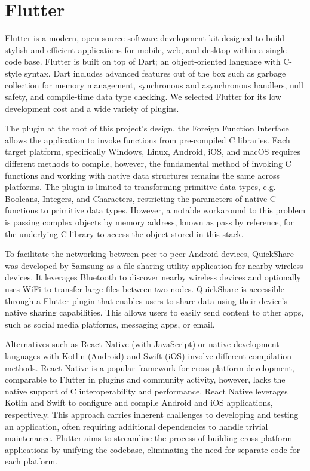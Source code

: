 \section{Flutter}
Flutter is a modern, open-source software development kit designed to build stylish and efficient applications for mobile, web, and desktop within a single code base. Flutter is built on top of Dart; an object-oriented language with C-style syntax. Dart includes advanced features out of the box such as garbage collection for memory management, synchronous and asynchronous handlers, null safety, and compile-time data type checking. We selected Flutter for its low development cost and a wide variety of plugins.

The plugin at the root of this project's design, the Foreign Function Interface allows the application to invoke functions from pre-compiled C libraries. Each target platform, specifically Windows, Linux, Android, iOS, and macOS requires different methods to compile, however, the fundamental method of invoking C functions and working with native data structures remains the same across platforms. The plugin is limited to transforming primitive data types, e.g. Booleans, Integers, and Characters, restricting the parameters of native C functions to primitive data types. However, a notable workaround to this problem is passing complex objects by memory address, known as pass by reference, for the underlying C library to access the object stored in this stack. 

To facilitate the networking between peer-to-peer Android devices, QuickShare \cite{samsung_quick_2020} was developed by Samsung as a file-sharing utility application for nearby wireless devices. It leverages Bluetooth to discover nearby wireless devices and optionally uses WiFi to transfer large files between two nodes. QuickShare is accessible through a Flutter plugin that enables users to share data using their device's native sharing capabilities. This allows users to easily send content to other apps, such as social media platforms, messaging apps, or email.

Alternatives such as React Native (with JavaScript) or native development languages with Kotlin (Android) and Swift (iOS) involve different compilation methods. React Native is a popular framework for cross-platform development, comparable to Flutter in plugins and community activity, however, lacks the native support of C interoperability and performance. React Native leverages Kotlin and Swift to configure and compile Android and iOS applications, respectively. This approach carries inherent challenges to developing and testing an application, often requiring additional dependencies to handle trivial maintenance. Flutter aims to streamline the process of building cross-platform applications by unifying the codebase, eliminating the need for separate code for each platform. 
